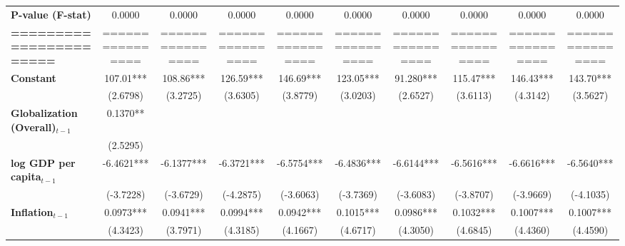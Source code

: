 \begin{center}
\begin{tabular}{lccccccccc}
\textbf{P-value (F-stat)}          &       0.0000       &       0.0000       &       0.0000       &       0.0000       &       0.0000       &       0.0000       &       0.0000       &       0.0000       &       0.0000        \\
\textbf{=======================}   &  ================  &  ================  &  ================  &  ================  &  ================  &  ================  &  ================  &  ================  &  ================   \\
\textbf{Constant}                     &     107.01***      &     108.86***      &     126.59***      &     146.69***      &     123.05***      &     91.280***      &     115.47***      &     146.43***      &     143.70***       \\
\textbf{ }                         &      (2.6798)      &      (3.2725)      &      (3.6305)      &      (3.8779)      &      (3.0203)      &      (2.6527)      &      (3.6113)      &      (4.3142)      &      (3.5627)       \\
\textbf{Globalization (Overall)$_{t-1}$}               &      0.1370**      &                    &                    &                    &                    &                    &                    &                    &                     \\
\textbf{ }                         &      (2.5295)      &                    &                    &                    &                    &                    &                    &                    &                     \\
\textbf{log GDP per capita$_{t-1}$}           &     -6.4621***     &     -6.1377***     &     -6.3721***     &     -6.5754***     &     -6.4836***     &     -6.6144***     &     -6.5616***     &     -6.6616***     &     -6.5640***      \\
\textbf{ }                         &     (-3.7228)      &     (-3.6729)      &     (-4.2875)      &     (-3.6063)      &     (-3.7369)      &     (-3.6083)      &     (-3.8707)      &     (-3.9669)      &     (-4.1035)       \\
\textbf{Inflation$_{t-1}$}      &     0.0973***      &     0.0941***      &     0.0994***      &     0.0942***      &     0.1015***      &     0.0986***      &     0.1032***      &     0.1007***      &     0.1007***       \\
\textbf{ }                         &      (4.3423)      &      (3.7971)      &      (4.3185)      &      (4.1667)      &      (4.6717)      &      (4.3050)      &      (4.6845)      &      (4.4360)      &      (4.4590)       \\

\end{tabular}
\end{center}
